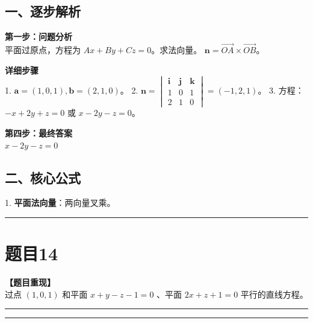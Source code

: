 \documentclass[12pt, a4paper]{ctexart}
\newcommand{\TopSeparator}{
    \par\noindent\rule{\textwidth}{1.5pt}\vspace{0.5em} %
}
\newcommand{\AnalysisSeparator}{
    \par\noindent\rule{\textwidth}{0.5pt}\vspace{0.2em}\hrule\vspace{0.5em} %
}
\newenvironment{RedAnalysis}{
    \par
    \color{red} %
}{
    \par
    \color{black} %
}
\begin{document}
\begin{RedAnalysis}

\subsection*{一、逐步解析}

\textbf{第一步：问题分析} \\
平面过原点，方程为 $Ax+By+Cz=0$。求法向量。
$\mathbf{n} = \overrightarrow{OA} \times \overrightarrow{OB}$。

\textbf{详细步骤} \\
1. $\mathbf{a} = (1,0,1), \mathbf{b} = (2,1,0)$。
2. $\mathbf{n} = \begin{vmatrix} \mathbf{i} & \mathbf{j} & \mathbf{k} \\ 1 & 0 & 1 \\ 2 & 1 & 0 \end{vmatrix} = (-1, 2, 1)$。
3. 方程：$-x + 2y + z = 0$ 或 $x - 2y - z = 0$。

\textbf{第四步：最终答案} \\
$ x - 2y - z = 0 $

\subsection*{二、核心公式}
1. \textbf{平面法向量}：两向量叉乘。

\end{RedAnalysis}

\vspace{2em}

\TopSeparator
\section*{题目14}

\textbf{【题目重现】} \\
过点 $ (1,0,1) $ 和平面 $ x+y-z-1=0 $ 、平面 $ 2x+z+1=0 $ 平行的直线方程。

\AnalysisSeparator
\end{document}
